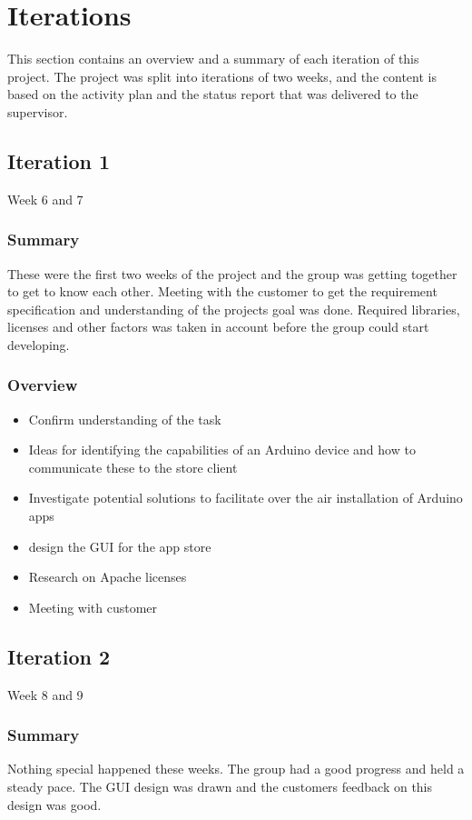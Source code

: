 \chapter{Iterations}

This section contains an overview and a summary of each iteration of this project. The project was split into
iterations of two weeks, and the content is based on the activity plan and the status report that was delivered to the supervisor.

\section{Iteration 1}
Week 6 and 7
\subsection{Summary}
	These were the first two weeks of the project and the group was getting together to get to know each other.
	Meeting with the customer to get the requirement specification and understanding of the projects goal was done.
	Required libraries, licenses and other factors was taken in account before the group could start developing.

\subsection{Overview}
\begin{itemize}
	\item{Confirm understanding of the task}
	\item{Ideas for identifying the capabilities of an Arduino device and how to communicate these to the store client}
	\item{Investigate potential solutions to facilitate over the air installation of Arduino apps}
	\item{design the GUI for the app store}
	\item{Research on Apache licenses}
	\item{Meeting with customer}
\end{itemize}

\section{Iteration 2}
Week 8 and 9
\subsection{Summary}
	Nothing special happened these weeks. The group had a good progress and held a steady pace. The GUI design was drawn
	and the customers feedback on this design was good.

